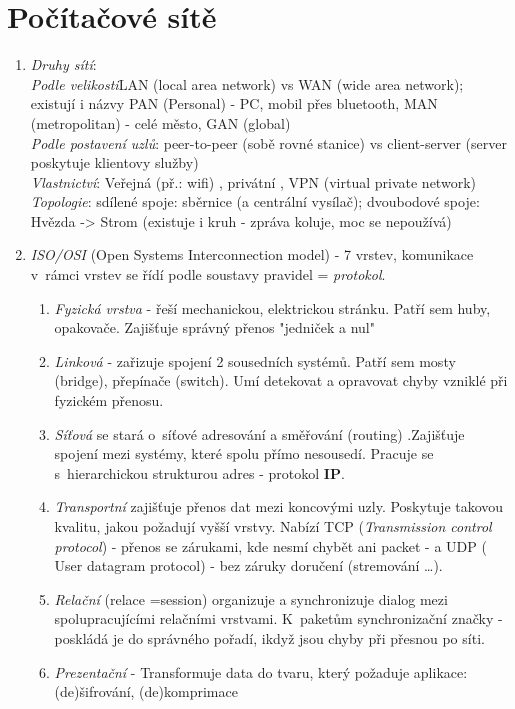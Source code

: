 \documentclass[12pt]{article}
\begin{document}
\section{Počítačové sítě}
\begin{enumerate}
\item \emph{Druhy sítí}:\\
\emph{Podle velikosti}LAN (local area network) vs WAN (wide area network); existují i názvy PAN (Personal) - PC, mobil přes bluetooth, MAN (metropolitan) - celé město, GAN (global)\\
\emph{Podle postavení uzlů}: peer-to-peer (sobě rovné stanice) vs client-server (server poskytuje klientovy služby)\\
\emph{Vlastnictví}: Veřejná (př.: wifi) , privátní , VPN (virtual private network)\\
\emph{Topologie}: 	sdílené spoje: sběrnice (a centrální vysílač); dvoubodové spoje: Hvězda -> Strom (existuje i kruh - zpráva koluje, moc se nepoužívá)
\item \emph{ISO/OSI} (Open Systems Interconnection model) - 7 vrstev, komunikace v~rámci vrstev se řídí podle soustavy pravidel = \emph{protokol}.
\begin{enumerate}
\item \emph{Fyzická vrstva} - řeší mechanickou, elektrickou stránku. Patří sem huby, opakovače. Zajišťuje správný přenos "jedniček a nul"
\item \emph{Linková} - zařizuje spojení 2 sousedních systémů. Patří sem mosty (bridge), přepínače (switch). Umí detekovat a opravovat chyby vzniklé při fyzickém přenosu.
\item \emph{Síťová} se stará o~síťové adresování a směřování (routing) .Zajišťuje spojení mezi systémy, které spolu přímo nesousedí. Pracuje se s~hierarchickou strukturou adres - protokol \textbf{IP}.
\item \emph{Transportní} zajišťuje přenos dat mezi koncovými uzly. Poskytuje takovou kvalitu, jakou požadují vyšší vrstvy. Nabízí TCP (\emph{Transmission control protocol}) - přenos se zárukami, kde nesmí chybět ani packet - a UDP ( User datagram protocol) - bez záruky doručení (stremování \dots).
\item \emph{Relační} (relace =session)  organizuje a synchronizuje dialog mezi spolupracujícími relačními vrstvami. K~paketům synchronizační značky - poskládá je do správného pořadí, ikdyž jsou chyby při přesnou po síti.
\item \emph{Prezentační} - Transformuje data do tvaru, který požaduje aplikace: (de)šifrování, (de)komprimace

\end{enumerate}
\end{enumerate}
\end{document}
